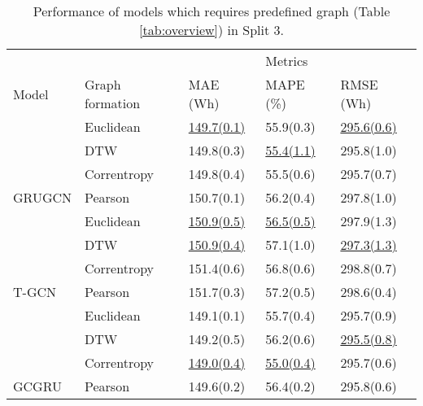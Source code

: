 \begin{table}[h!]
\centering
\caption{Performance of models which requires predefined graph 
\newline
(Table \ref{tab:overview}) in Split 3.}
\begin{tabular}{@{}lllll@{}}
                          &     &     & Metrics  &    \\
\multirow{-2}{*}{Model}   & \multirow{-2}{*}{Graph  formation} & MAE (Wh) & MAPE (\%)    & RMSE (Wh)                                                                                        \\
\hline
                          & Euclidean        & \underline{149.7(0.1)} & 55.9(0.3) & \underline{295.6(0.6)   }\\
                          & DTW              & 149.8(0.3) & \underline{55.4(1.1)} & 295.8(1.0) \\
                          & Correntropy      & 149.8(0.4) & 55.5(0.6) & 295.7(0.7)   \\
\multirow{-4}{*}{GRUGCN}                          & Pearson          & 150.7(0.1) & 56.2(0.4) & 297.8(1.0)   \\
\hline
                          & Euclidean        & \underline{150.9(0.5)} & \underline{56.5(0.5)} & 297.9(1.3)   \\
                          & DTW              & \underline{150.9(0.4)} & 57.1(1.0) & \underline{297.3(1.3)}    \\
                          & Correntropy      & 151.4(0.6) & 56.8(0.6) & 298.8(0.7)  \\
\multirow{-4}{*}{T-GCN}                           & Pearson          & 151.7(0.3) & 57.2(0.5) & 298.6(0.4) \\
\hline
                          & Euclidean        & 149.1(0.1) & 55.7(0.4) & 295.7(0.9) \\
                          & DTW              & 149.2(0.5) & 56.2(0.6) & \underline{295.5(0.8)}     \\
                          & Correntropy      & \underline{149.0(0.4)} & \underline{55.0(0.4)} & 295.7(0.6) \\
\multirow{-4}{*}{GCGRU}                          & Pearson          & 149.6(0.2) & 56.4(0.2) & 295.8(0.6)  \\
\hline
\end{tabular}
\label{tab:graph_formation}
\end{table}


